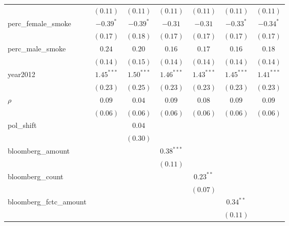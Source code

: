\begin{table}[!h]
\begin{center}
\begin{tabular}{l c c c c c c }
                        & $(0.11)$     & $(0.11)$     & $(0.11)$     & $(0.11)$     & $(0.11)$     & $(0.11)$     \\
perc\_female\_smoke     & $-0.39^{*}$  & $-0.39^{*}$  & $-0.31$      & $-0.31$      & $-0.33^{*}$  & $-0.34^{*}$  \\
                        & $(0.17)$     & $(0.18)$     & $(0.17)$     & $(0.17)$     & $(0.17)$     & $(0.17)$     \\
perc\_male\_smoke       & $0.24$       & $0.20$       & $0.16$       & $0.17$       & $0.16$       & $0.18$       \\
                        & $(0.14)$     & $(0.15)$     & $(0.14)$     & $(0.14)$     & $(0.14)$     & $(0.14)$     \\
year2012                & $1.45^{***}$ & $1.50^{***}$ & $1.46^{***}$ & $1.43^{***}$ & $1.45^{***}$ & $1.41^{***}$ \\
                        & $(0.23)$     & $(0.25)$     & $(0.23)$     & $(0.23)$     & $(0.23)$     & $(0.23)$     \\
$\rho$                  & $0.09$       & $0.04$       & $0.09$       & $0.08$       & $0.09$       & $0.09$       \\
                        & $(0.06)$     & $(0.06)$     & $(0.06)$     & $(0.06)$     & $(0.06)$     & $(0.06)$     \\
pol\_shift              &              & $0.04$       &              &              &              &              \\
                        &              & $(0.30)$     &              &              &              &              \\
bloomberg\_amount       &              &              & $0.38^{***}$ &              &              &              \\
                        &              &              & $(0.11)$     &              &              &              \\
bloomberg\_count        &              &              &              & $0.23^{**}$  &              &              \\
                        &              &              &              & $(0.07)$     &              &              \\
bloomberg\_fctc\_amount &              &              &              &              & $0.34^{**}$  &              \\
                        &              &              &              &              & $(0.11)$     &              \\

\end{tabular}
\end{center}
\end{table}
